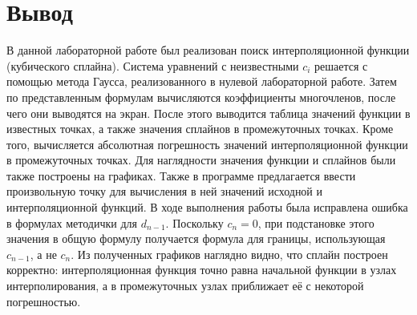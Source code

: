 \documentclass[a4paper, 14pt]{extarticle}
\begin{document}
\section{Вывод}
В данной лабораторной работе был реализован поиск интерполяционной функции (кубического 
сплайна). Система уравнений с неизвестными $c_i$ решается с помощью метода Гаусса, реализованного
в нулевой лабораторной работе. Затем по представленным формулам вычисляются коэффициенты многочленов, 
после чего они выводятся на экран. После этого выводится таблица значений функции в известных точках, а также значения сплайнов в промежуточных точках. Кроме того, вычисляется абсолютная погрешность значений интерполяционной функции в промежуточных точках. Для наглядности значения функции и сплайнов были также построены на графиках. Также в программе 
предлагается ввести произвольную точку для вычисления в ней значений исходной и интерполяционной функций. В ходе выполнения работы была исправлена ошибка в формулах методички для $d_{n-1}$. Поскольку $c_n = 0$, при подстановке этого значения в общую формулу получается формула для границы, использующая $c_{n-1}$, а не $c_n$. Из полученных графиков наглядно видно, что
сплайн построен корректно: интерполяционная функция точно равна начальной функции в узлах интерполирования, а в промежуточных
узлах приближает её с некоторой погрешностью.
\end{document}
